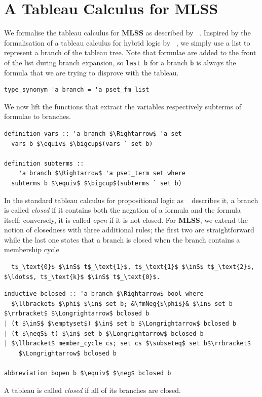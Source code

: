 \documentclass[
  sigplan,
  10pt,
  ]{acmart}
\newcommand{\MLSS}{\textbf{MLSS}}
\newcommand{\inS}{\in_\text{s}}
\newcommand{\neqS}{\neq_\text{s}}
\newcommand{\fmNegSymbol}{\boldsymbol{\neg}}
\newcommand{\fmNeg}[1]{$\fmNegSymbol$ #1}
\begin{document}
\section{A Tableau Calculus for MLSS}
We formalise the tableau calculus for \MLSS{} as described by \citeauthor{new_fast_tableau}~\cite{new_fast_tableau}.
Inspired by the formalisation of a tableau calculus for hybrid logic by \citeauthor{hybrid_logic_afp}~\cite{hybrid_logic_afp}, we simply use a list to represent a branch of the tableau tree.
Note that formulae are added to the front of the list during branch expansion, so \lstinline!last b! for a branch \lstinline!b! is always the formula that we are trying to disprove with the tableau. 
\begin{lstlisting}
type_synonym 'a branch = 'a pset_fm list
\end{lstlisting}
We now lift the functions that extract the variables respectively subterms of formulae to branches.
\begin{lstlisting}
definition vars :: 'a branch $\Rightarrow$ 'a set 
  vars b $\equiv$ $\bigcup$(vars ` set b)

definition subterms ::
    'a branch $\Rightarrow$ 'a pset_term set where
  subterms b $\equiv$ $\bigcup$(subterms ` set b)
\end{lstlisting}
In the standard tableau calculus for propositional logic as \citeauthor{tableau}~\cite{tableau} describes it, a branch is called \textit{closed} if it contains both the negation of a formula and the formula itself;
conversely, it is called \textit{open} if it is not closed.
For \MLSS{}, we extend the notion of closedness with three additional rules; the first two are straightforward while the last one states that a branch is closed when the branch contains a membership cycle
\begin{lstlisting}
  t$_\text{0}$ $\inS$ t$_\text{1}$, t$_\text{1}$ $\inS$ t$_\text{2}$, $\ldots$, t$_\text{k}$ $\inS$ t$_\text{0}$.
\end{lstlisting}

\begin{lstlisting}
inductive bclosed :: 'a branch $\Rightarrow$ bool where
  $\llbracket$ $\phi$ $\in$ set b; &\fmNeg{$\phi$}& $\in$ set b $\rrbracket$ $\Longrightarrow$ bclosed b
| (t $\inS$ $\emptyset$) $\in$ set b $\Longrightarrow$ bclosed b
| (t $\neqS$ t) $\in$ set b $\Longrightarrow$ bclosed b
| $\llbracket$ member_cycle cs; set cs $\subseteq$ set b$\rrbracket$
    $\Longrightarrow$ bclosed b

abbreviation bopen b $\equiv$ $\neg$ bclosed b
\end{lstlisting}
A tableau is called \textit{closed} if all of its branches are closed.
\end{document}
